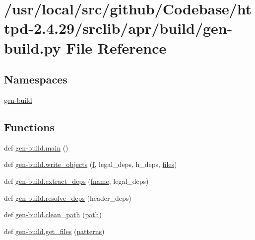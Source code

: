 \hypertarget{gen-build_8py}{}\section{/usr/local/src/github/\+Codebase/httpd-\/2.4.29/srclib/apr/build/gen-\/build.py File Reference}
\label{gen-build_8py}
\subsection*{Namespaces}
\begin{DoxyCompactItemize}
\item 
 \hyperlink{namespacegen-build}{gen-\/build}
\end{DoxyCompactItemize}
\subsection*{Functions}
\begin{DoxyCompactItemize}
\item 
def \hyperlink{namespacegen-build_a303de3964ffc3ff5955d16fd7ed6aa55}{gen-\/build.\+main} ()
\item 
def \hyperlink{namespacegen-build_a72863c184bb8734b32f7480d89f664ce}{gen-\/build.\+write\+\_\+objects} (\hyperlink{pcregrep_8txt_a588c778c1c1509e472f22dc36efb005e}{f}, legal\+\_\+deps, h\+\_\+deps, \hyperlink{pcregrep_8txt_a5aaeef01bce395cfcb41dd64a3bf8607}{files})
\item 
def \hyperlink{namespacegen-build_ae04145837dc1f16d63faf1c2853fef79}{gen-\/build.\+extract\+\_\+deps} (\hyperlink{group__apr__proc__mutex_ga6a2fc0c236288b07ce5bd1335ca89fa2}{fname}, legal\+\_\+deps)
\item 
def \hyperlink{namespacegen-build_ad10a7a9d086bd1923df405f9d928e6bd}{gen-\/build.\+resolve\+\_\+deps} (header\+\_\+deps)
\item 
def \hyperlink{namespacegen-build_af6d7251642e30bfe9bd19cec915968fb}{gen-\/build.\+clean\+\_\+path} (\hyperlink{ab_8c_a3b02c6de5c049804444a246f7fdf46b4}{path})
\item 
def \hyperlink{namespacegen-build_ae60d7eb60e53d27cf693a1efb8b3c278}{gen-\/build.\+get\+\_\+files} (\hyperlink{pcregrep_8txt_aca23d6bf5b793a5e2a75a714f962e664}{patterns})
\end{DoxyCompactItemize}
